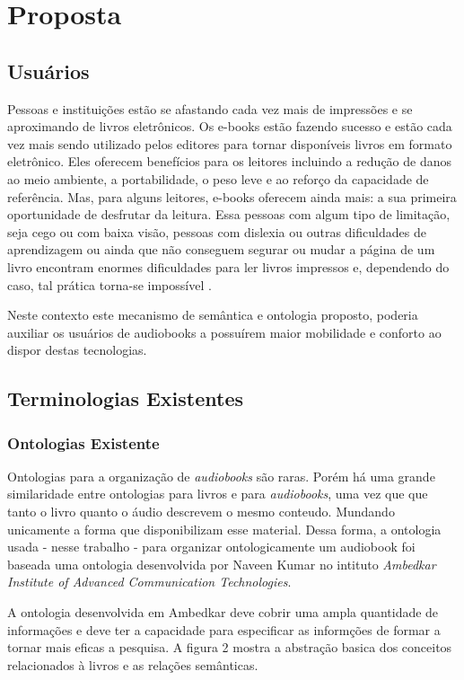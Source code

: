 \chapter{Proposta}\label{cap4}

\section{Usuários}

Pessoas e instituições estão se afastando cada vez mais de impressões e se aproximando de livros eletrônicos. Os e-books estão fazendo sucesso e estão cada vez mais sendo utilizado pelos editores para tornar disponíveis livros em formato eletrônico. Eles oferecem benefícios para os leitores incluindo a redução de danos ao meio ambiente, a portabilidade, o peso leve e ao reforço da capacidade de referência. Mas, para alguns leitores, e-books oferecem ainda mais: a sua primeira oportunidade de desfrutar da leitura. Essa pessoas com algum tipo de limitação, seja cego ou com baixa visão, pessoas com dislexia ou outras dificuldades de aprendizagem ou ainda que não conseguem segurar ou mudar a página de um livro encontram enormes dificuldades para ler livros impressos e, dependendo do caso, tal prática torna-se impossível \cite{chronicle}.

Neste contexto este mecanismo de semântica e ontologia proposto, poderia auxiliar os usuários de audiobooks a possuírem maior mobilidade e conforto ao dispor destas tecnologias.

\section{Terminologias Existentes}

\subsection{Ontologias Existente}
Ontologias para a organização de \textit{audiobooks} são raras. Porém há uma grande similaridade entre ontologias para livros e para \textit{audiobooks}, uma vez que que tanto o livro quanto o áudio descrevem o mesmo conteudo. Mundando unicamente a forma que disponibilizam esse material. Dessa forma, a ontologia usada - nesse trabalho - para organizar ontologicamente um audiobook foi baseada uma ontologia desenvolvida por Naveen Kumar no intituto \textit{Ambedkar Institute of Advanced Communication Technologies}. 

A ontologia desenvolvida em Ambedkar deve cobrir uma ampla quantidade de informações e deve ter a capacidade para especificar as informções de formar a tornar mais eficas a pesquisa\cite{ontologybook}. A figura 2 mostra a abstração basica dos conceitos relacionados à livros e as relações semânticas. 

